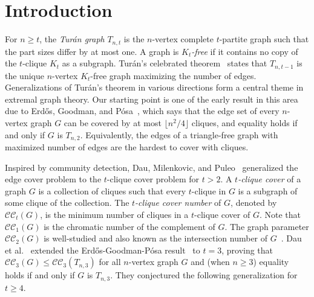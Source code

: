 \documentclass[11pt,a4paper]{article}
\newcommand{\tcoveropt}[1]{\mathcal{C}\mathcal{C}_t(#1)}
\newcommand{\turangraph}[2]{T_{#1,#2}}
\newcommand{\coveropt}[2]{{\mathcal{C}\mathcal{C}_{#1}(#2)}}
\begin{document}
\section{Introduction}
For $n \ge t$, the \emph{Tur\'an graph} $\turangraph{n}{t}$ is the $n$-vertex complete $t$-partite graph such that the part sizes differ by at most one.
A graph is \textit{$K_t$-free} if it contains no copy of the $t$-clique $K_t$ as a subgraph.
Tur\'an's celebrated theorem~\cite{Turan} states that $\turangraph{n}{t-1}$ is the unique $n$-vertex $K_t$-free graph maximizing the number of edges. 
Generalizations of Tur\'an's theorem in various directions form a central theme in extremal graph theory.
Our starting point is one of the early result in this area due to Erd\H{o}s, Goodman, and P\'osa~\cite{EGP}, which says that the edge set of every $n$-vertex graph $G$ can be covered by at most $\lfloor n^2/4 \rfloor$ cliques, and equality holds if and only if $G$ is $\turangraph{n}{2}.$
Equivalently, the edges of a triangle-free graph with maximized number of edges are the hardest to cover with cliques.
 
Inspired by community detection, Dau, Milenkovic, and Puleo~\cite{DMP} generalized the edge cover problem to the $t$-clique cover problem for $t > 2$.
A \emph{$t$-clique cover} of a graph $G$ is a collection of cliques such that every $t$-clique in $G$ is a subgraph of some clique of the collection. 
The \emph{$t$-clique cover number} of $G$, denoted by $\tcoveropt{G}$, is the minimum number of cliques in a $t$-clique cover of $G$.
Note that $\coveropt{1}{G}$ is the chromatic number of the complement of $G$. 
The graph parameter $\coveropt{2}{G}$ is well-studied and also known as the intersection number of $G$~\cite{EGP,L68,R85,ST99}. 
Dau et al.~\cite{DMP} extended the Erd\H{o}s-Goodman-P\'osa result~\cite{EGP} to $t=3$, 
proving that $\mathcal{C}\mathcal{C}_3(G)\le \mathcal{C}\mathcal{C}_3(\turangraph{n}{3})$ for all $n$-vertex graph $G$ and (when $n \ge 3$) equality holds if and only if $G$ is $\turangraph{n}{3}$. 
They conjectured the following generalization for $t\ge4$.

\end{document}
